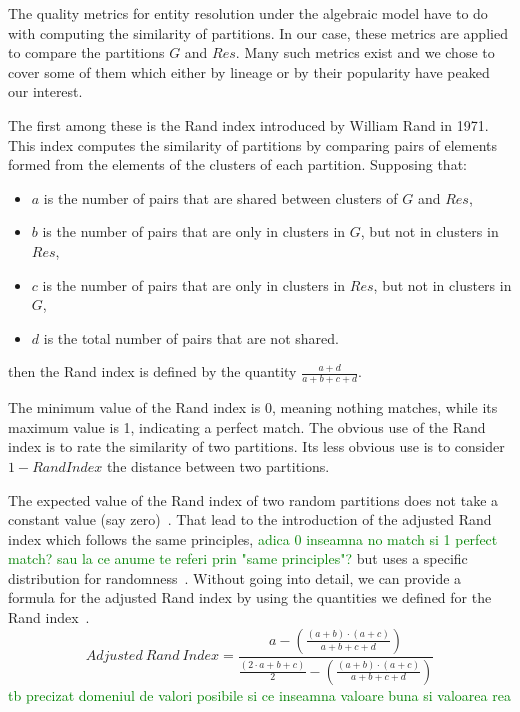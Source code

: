\documentclass[journal]{IEEEtran}
\begin{document}
    The quality metrics for entity resolution under the algebraic model have to
    do with computing the similarity of partitions.
    In our case, these metrics are applied to compare the partitions $G$ and
    $Res$.
    Many such metrics exist\cite{hitesh2012} and we chose to cover some of them
    which either by lineage or by their popularity have peaked our interest.

    The first among these is the Rand index introduced by William Rand in
    1971\cite{rand1971}.
    This index computes the similarity of partitions by comparing pairs of
    elements formed from the elements of the clusters of each partition.
    Supposing that:
    \begin{itemize}
        \item $a$ is the number of pairs that are shared between clusters of $G$
        and $Res$,
        \item $b$ is the number of pairs that are only in clusters in $G$, but
        not in clusters in $Res$,
        \item $c$ is the number of pairs that are only in clusters in $Res$, but
        not in clusters in $G$,
        \item $d$ is the total number of pairs that are not shared.
    \end{itemize}
    then the Rand index is defined by the quantity
    $\frac{a+d}{a+b+c+d}$\cite{adjrand2001}.

    The minimum value of the Rand index is 0, meaning nothing matches, while its
    maximum value is 1, indicating a perfect match.
    The obvious use of the Rand index is to rate the similarity of two
    partitions.
    Its less obvious use is to consider $1 - Rand Index$ the distance between
    two partitions.

    The expected value of the Rand index of two random partitions does not take
    a constant value (say zero)~\cite{adjrand2001}.
    That lead to the introduction of the adjusted Rand index which follows the
    same principles, 
    \textcolor{green}{adica 0 inseamna no match si 1 perfect match? sau la ce anume te referi prin "same principles"?}
    but uses a specific distribution for
    randomness~\cite{adjrand1985}.
    Without going into detail, we can provide a formula for the adjusted Rand
    index by using the quantities we defined for the Rand index~\cite{Tal11}.
    \[
        Adjusted~Rand~Index = \frac{
            a -\left(\frac{(a+b)\cdot(a+c)}{a+b+c+d}\right)
        }{
            \frac{(2\cdot a+b+c)}{2}-\left(\frac{(a+b)\cdot(a+c)}{a+b+c+d}\right)
        }
    \]
    \textcolor{green}{tb precizat domeniul de valori posibile si ce inseamna valoare buna si valoarea rea}
\end{document}
